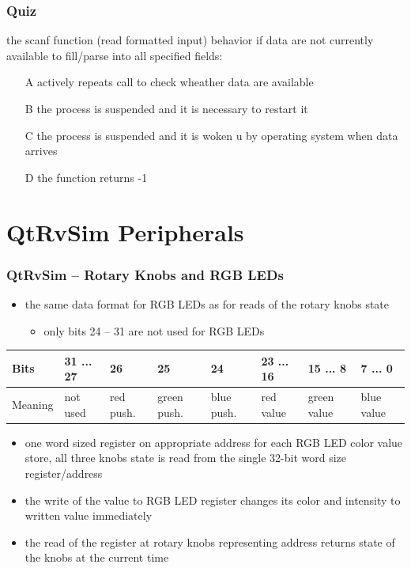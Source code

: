 \documentclass{beamer}
\begin{document}
\begin{frame}
\frametitle{Quiz}

the scanf function (read formatted input) behavior if data are not currently available to fill/parse into all specified fields:

\begin{itemize}
\item[A] actively repeats call to check wheather data are available
\item[B] the process is suspended and it is necessary to restart it
\item[C] the process is suspended and it is woken u by operating system when data arrives
\item[D] the function returns -1
\end{itemize}
\end{frame}



\section{QtRvSim Peripherals}

\begin{frame}
\frametitle{QtRvSim -- Rotary Knobs and RGB LEDs}

\begin{itemize}
\item the same data format for RGB LEDs as for reads of the rotary knobs state
\begin{itemize}
\item only bits 24 -- 31 are not used for RGB LEDs
\end{itemize}
\end{itemize}

\begin{table}
\scriptsize
\begin{tabular}{|m{1.0cm}|m{1.1cm}|m{0.5cm}|m{0.5cm}|m{0.5cm}|m{1.1cm}|m{1.1cm}|m{1.1cm}|}\hline
Bits & 31 ... 27 & 26 & 25 & 24 & 23 ... 16 & 15 ... 8 & 7 ... 0 \\ \hline
Meaning & not used & red push. & green push. & blue push. & red value & green value & blue value \\ \hline
\end{tabular}
\end{table}


\begin{itemize}
\item one word sized register on appropriate address for each RGB LED color value store, all three knobs state is read from the single 32-bit word size register/address
\item the write of the value to RGB LED register changes its color and intensity to written value immediately
\item the read of the register at rotary knobs representing address returns state of the knobs at the current time
\end{itemize}

\end{frame}
\end{document}
